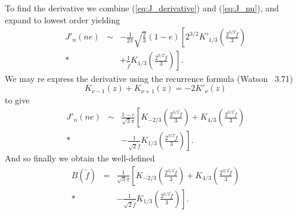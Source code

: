 \documentclass[aps,prd,amsfonts,amssymb,amsmath,nofootinbib,floatfix,reprint,showpacs,groupedaddress]{revtex4-1}
\newcommand{\eqnref}[1]{(\ref{eq:#1})}
\newcommand{\recip}[1]{\ensuremath{\frac{1}{#1}}}
\begin{document}
To find the derivative we combine \eqnref{J_derivative} and \eqnref{J_nu}, and expand to lowest order yielding
\begin{eqnarray}
J'_n(ne) & \sim & -\frac{1}{2\pi}\sqrt{\frac{2}{3}}(1-e)\left[2^{3/2}K'_{1/3}\left(\frac{2^{3/2}\tilde{f}}{3}\right) \right. \nonumber \\*
 & & \left. + \recip{\tilde{f}}K_{1/3}\left(\frac{2^{3/2}\tilde{f}}{3}\right)\right].
\end{eqnarray}
We may re express the derivative using the recurrence formula (Watson~\cite{Watson1995} 3.71)
\begin{equation}
K_{\nu-1}(z) + K_{\nu+1}(z) = -2K'_\nu(z)
\end{equation}
to give
\begin{eqnarray}
J'_n(ne) & \sim & \frac{1-e}{\sqrt{3}\pi}\left[K_{-2/3}\left(\frac{2^{3/2}\tilde{f}}{3}\right) + K_{4/3}\left(\frac{2^{3/2}\tilde{f}}{3}\right) \right. \nonumber \\*
 & & \left. - \recip{\sqrt{2}\tilde{f}}K_{1/3}\left(\frac{2^{3/2}\tilde{f}}{3}\right)\right].
\end{eqnarray}
And so finally we obtain the well-defined
\begin{eqnarray}
B(\tilde{f}) & = & \recip{\sqrt{3}\pi}\left[K_{-2/3}\left(\frac{2^{3/2}\tilde{f}}{3}\right) + K_{4/3}\left(\frac{2^{3/2}\tilde{f}}{3}\right) \right. \nonumber \\*
 & & \left. - \recip{\sqrt{2}\tilde{f}}K_{1/3}\left(\frac{2^{3/2}\tilde{f}}{3}\right)\right].
\end{eqnarray}
\end{document}
